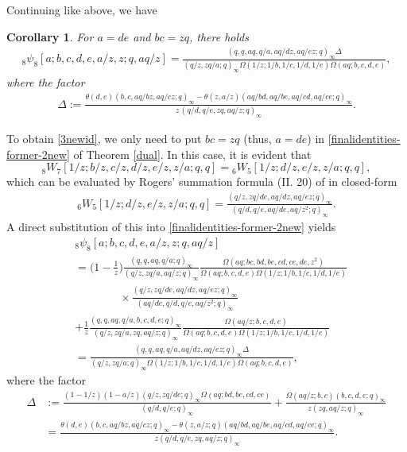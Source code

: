 \documentclass[xits,review,sort&compress]{elsarticle}
\newtheorem{tl}[dl]{Corollary}
\numberwithin{equation}{section}
\newcommand{\poq}[2]{(#1;q)_{#2}}
\def\pf{\noindent {\it Proof.} }
\begin{document}
Continuing like above, we have
\begin{tl}\label{3new}For  $a=de$ and $bc=zq$, there holds
 \begin{align}
 {}_{8} \psi_{8}\left[a; b, c, d, e, a/z, z ; q, aq/z\right]=\frac{(q,q,aq, q / a,aq/dz,aq/ez; q)_{\infty}\Delta}{(q/z,zq/a; q)_{\infty}
 \Omega(1/z;1/b,1/c,1/d,1/e)\Omega(aq; b,  c, d,  e)},\label{3newid}
\end{align}
where the factor
\begin{align}
\Delta:=\frac{\theta(d,e)(b, c,aq/bz,aq/cz; q)_{\infty}-\theta(z,a/z)(aq/bd,aq/be,aq/cd,aq/ce;q)_\infty}
{z\,(q/d,q/e,zq,aq/z; q)_{\infty}}.\nonumber
\end{align}
 \end{tl}
\pf  To obtain \eqref{3newid},  we only need to put $bc=zq$ (thus, $a=de$) in  \eqref{finalidentities-former-2new} of  Theorem \ref{dual}. In this case, it is evident that
\[{}_{8}W_{7}[1/z ; b/z, c/z, d/z, e/z, z/a; q, q]={}_{6}W_{5}[1/z; d/z, e/z, z/a; q, q],\]
which can be evaluated by  Rogers' summation formula (II. 20) of \cite{10} in closed-form
\begin{align}
{}_{6}W_{5}[1/z ; d/z, e/z, z/a; q, q]=\frac{\poq{q/z,zq/d e,a q/d z,a q/e z}{\infty}}{\poq{q/d,q/e,aq/de,a q/z^2}{\infty}}.
\end{align}
A direct substitution of  this  into \eqref{finalidentities-former-2new} yields
 \begin{align*}
 &{}_{8} \psi_{8}\left[a; b, c, d, e, a/z, z ; q, aq/z\right] \nonumber\\
 &=\bigg(1-\frac{1}{z}\bigg)\frac{(q,q,aq, q /a; q)_{\infty}}{\left(q/z,zq/a, aq/z;q\right)_{\infty}}\frac{\Omega(aq;bc,bd,be,cd,ce,de,z^2)}{\Omega(aq;b,c,d,e)\Omega(1/z;1/b,1/c,1/d,
 1/e)}\nonumber\\
  &\qquad\qquad\times\frac{\poq{q/z,zq/d e,a q/d z,a q/e z}{\infty}}{\poq{a q/d e,q/d,q/e,a q/z^2}{\infty}}\\
 &+\frac{1}{z}\frac{(q,q,aq, q / a,b, c, d, e; q)_{\infty}}{(q/z,zq/a,zq,aq/z; q)_{\infty}}
 \frac{\Omega(aq/z;b,c,d,e)}{\Omega(aq; b,  c, d,  e)
 \Omega(1/z;1/b,1/c,1/d,1/e)}\\
&=\frac{(q,q,aq, q / a,aq/dz,aq/ez; q)_{\infty}\Delta}{(q/z,zq/a; q)_{\infty}
 \Omega(1/z;1/b,1/c,1/d,1/e)\Omega(aq; b,  c, d,  e)},
\end{align*}
where the factor
\begin{align*}\Delta &:=
\frac{(1-1/z)(1-a/z)\poq{q/z,zq/d e}{\infty}\Omega(aq;bd,be,cd,ce)}{\left(q/d,q/e;q\right)_{\infty}}+\frac{\Omega(aq/z;b,c)(b, c, d, e; q)_{\infty}}{z(zq,aq/z; q)_{\infty}}
 \\
&=\frac{\theta(d,e)(b, c,aq/bz,aq/cz; q)_{\infty}-\theta(z,a/z; q)(aq/bd,aq/be,aq/cd,aq/ce;q)_\infty}{z(q/d,q/e,zq,aq/z; q)_{\infty}}.
\end{align*}
\end{document}
